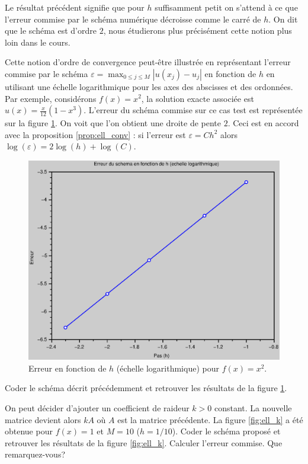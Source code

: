 \documentclass[12pt,a4paper,twoside]{article}
\begin{document}
Le r\'esultat pr\'ec\'edent signifie que pour $h$ suffisamment petit
on s'attend \`a ce que l'erreur commise par le sch\'ema num\'erique d\'ecroisse
comme le carr\'e de $h$.
On dit que le sch\'ema est d'ordre $2$, nous \'etudierons plus pr\'ecis\'ement cette notion
plus loin dans le cours.


Cette notion d'ordre de convergence peut-\^etre illustr\'ee en repr\'esentant 
l'erreur commise par le sch\'ema 
$\varepsilon = \max_{0\leq j \leq M} |u(x_j) - u_j|$ en fonction de $h$ 
en utilisant une \'echelle logarithmique
pour les axes des abscisses et des ordonn\'ees.
Par exemple, consid\'erons $f(x) = x^2$, la solution exacte associ\'ee
est $u(x) = \frac{x}{12}(1-x^3)$.
L'erreur du sch\'ema commise sur ce cas test est repr\'esent\'ee
sur la figure \ref{fig:ell_convergence}.
On voit que l'on obtient une droite de pente $2$.
Ceci est en accord avec la proposition \ref{prop:ell_conv} :
si l'erreur est $\varepsilon = C h^2$ alors
$\log(\varepsilon) = 2 \log(h) + \log(C)$.

\begin{figure}[h]
  \centering
  \includegraphics[width = 12cm]{Figures/Poisson_conv.eps}
  \caption{Erreur en fonction de $h$ (\'echelle logarithmique)
    pour $f(x) = x^2$.}
  \label{fig:ell_convergence}
\end{figure}


\begin{exercise}
  Coder le sch\'ema d\'ecrit pr\'ec\'edemment et retrouver les 
  r\'esultats de la figure \ref{fig:ell_convergence}.
\end{exercise}

\begin{exercise}
  On peut d\'ecider d'ajouter un coefficient de raideur $k>0$ constant.
  La nouvelle matrice devient alors $k A$ o\`u $A$ est la matrice 
  pr\'ec\'edente.
  La figure \ref{fig:ell_k} a \'et\'e obtenue pour $f(x) = 1$
  et $M=10$ ($h=1/10$).
  Coder le sch\'ema propos\'e et retrouver les r\'esultats
  de la figure \ref{fig:ell_k}.
  Calculer l'erreur commise. Que remarquez-vous?
\end{exercise}
\end{document}
